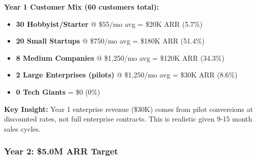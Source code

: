 \textbf{Year 1 Customer Mix (60 customers total):}
\begin{itemize}[noitemsep]
    \item \textbf{30 Hobbyist/Starter} @ \$55/mo avg = \$20K ARR (5.7\%)
    \item \textbf{20 Small Startups} @ \$750/mo avg = \$180K ARR (51.4\%)
    \item \textbf{8 Medium Companies} @ \$1,250/mo avg = \$120K ARR (34.3\%)
    \item \textbf{2 Large Enterprises (pilots)} @ \$1,250/mo avg = \$30K ARR (8.6\%)
    \item \textbf{0 Tech Giants} = \$0 (0\%)
\end{itemize}

\textbf{Key Insight:} Year 1 enterprise revenue (\$30K) comes from pilot conversions at discounted rates, not full enterprise contracts. This is realistic given 9-15 month sales cycles.

\subsubsection{Year 2: \$5.0M ARR Target}

